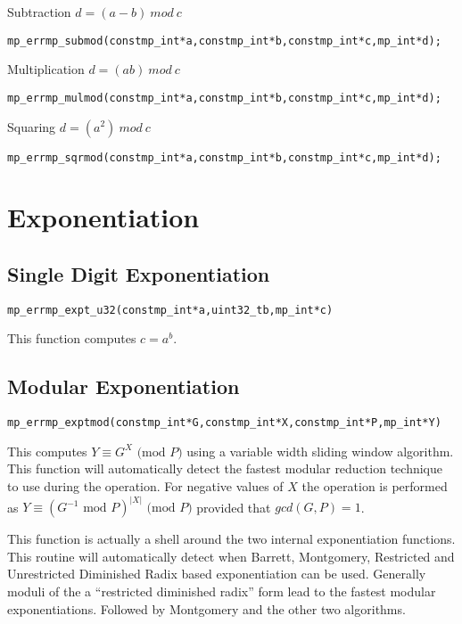 \documentclass[synpaper]{book}
\def\mod{{\mathit\ mod\ }}
\begin{document}
Subtraction  $d = (a - b) \mod c$
\begin{alltt}
mp_err mp_submod(const mp_int *a, const mp_int *b, const mp_int *c, mp_int *d);
\end{alltt}

Multiplication $d = (ab) \mod c$
\begin{alltt}
mp_err mp_mulmod(const mp_int *a, const mp_int *b, const mp_int *c, mp_int *d);
\end{alltt}

Squaring  $d = (a^2) \mod c$
\begin{alltt}
mp_err mp_sqrmod(const mp_int *a, const mp_int *b, const mp_int *c, mp_int *d);
\end{alltt}

\chapter{Exponentiation}
\section{Single Digit Exponentiation}
\begin{alltt}
mp_err mp_expt_u32 (const mp_int *a, uint32_t b, mp_int *c)
\end{alltt}
This function computes $c = a^b$.

\section{Modular Exponentiation}
\begin{alltt}
mp_err mp_exptmod (const mp_int *G, const mp_int *X, const mp_int *P, mp_int *Y)
\end{alltt}
This computes $Y \equiv G^X \mbox{ (mod }P\mbox{)}$ using a variable width sliding window
algorithm.  This function will automatically detect the fastest modular reduction technique to use
during the operation. For negative values of $X$ the operation is performed as $Y \equiv (G^{-1}
  \mbox{ mod }P)^{\vert X \vert} \mbox{ (mod }P\mbox{)}$ provided that $gcd(G, P) = 1$.

This function is actually a shell around the two internal exponentiation functions.  This routine
will automatically detect when Barrett, Montgomery, Restricted and Unrestricted Diminished Radix
based exponentiation can be used.  Generally moduli of the a ``restricted diminished radix'' form
lead to the fastest modular exponentiations. Followed by Montgomery and the other two algorithms.
\end{document}
